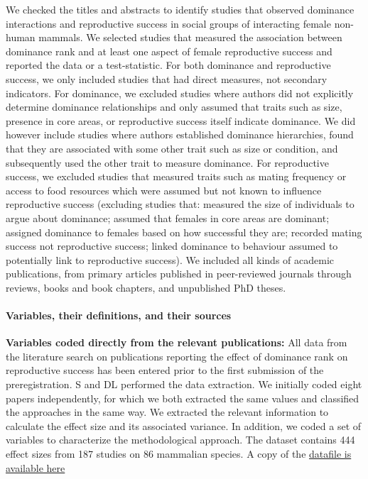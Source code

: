 \documentclass[]{article}
\let\oldparagraph\paragraph
\renewcommand{\paragraph}[1]{\oldparagraph{#1}\mbox{}}
\begin{document}
We checked the titles and abstracts to identify studies that observed
dominance interactions and reproductive success in social groups of
interacting female non-human mammals. We selected studies that measured
the association between dominance rank and at least one aspect of female
reproductive success and reported the data or a test-statistic. For both
dominance and reproductive success, we only included studies that had
direct measures, not secondary indicators. For dominance, we excluded
studies where authors did not explicitly determine dominance
relationships and only assumed that traits such as size, presence in
core areas, or reproductive success itself indicate dominance. We did
however include studies where authors established dominance hierarchies,
found that they are associated with some other trait such as size or
condition, and subsequently used the other trait to measure dominance.
For reproductive success, we excluded studies that measured traits such
as mating frequency or access to food resources which were assumed but
not known to influence reproductive success (excluding studies that:
measured the size of individuals to argue about dominance; assumed that
females in core areas are dominant; assigned dominance to females based
on how successful they are; recorded mating success not reproductive
success; linked dominance to behaviour assumed to potentially link to
reproductive success). We included all kinds of academic publications,
from primary articles published in peer-reviewed journals through
reviews, books and book chapters, and unpublished PhD theses.

\hypertarget{variables-their-definitions-and-their-sources}{%
\paragraph{\texorpdfstring{\textbf{Variables, their definitions, and
their
sources}}{Variables, their definitions, and their sources}}\label{variables-their-definitions-and-their-sources}}

\textbf{Variables coded directly from the relevant publications:} All
data from the literature search on publications reporting the effect of
dominance rank on reproductive success has been entered prior to the
first submission of the preregistration. S and DL performed the data
extraction. We initially coded eight papers independently, for which we
both extracted the same values and classified the approaches in the same
way. We extracted the relevant information to calculate the effect size
and its associated variance. In addition, we coded a set of variables to
characterize the methodological approach. The dataset contains 444
effect sizes from 187 studies on 86 mammalian species. A copy of the
\href{https://github.com/dieterlukas/FemaleDominanceReproduction_MetaAnalysis}{datafile
is available here}
\end{document}
